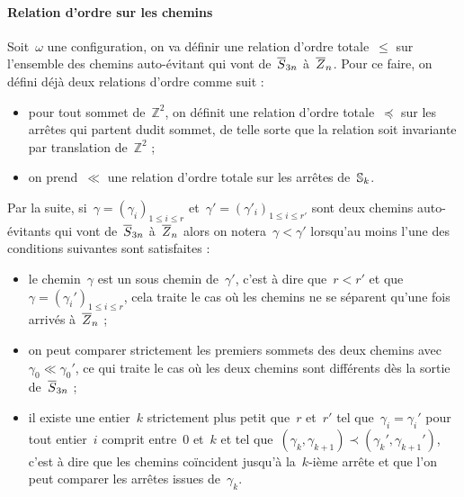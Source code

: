 		\paragraph{Relation d'ordre sur les chemins}
			Soit~$\omega$ une configuration, on va définir une relation d'ordre totale~$\leq$ sur l'ensemble des chemins auto-évitant qui vont de~$\overline{S}_{3n}$ à~$\overline{Z}_{n}$. Pour ce faire, on défini déjà deux relations d'ordre comme suit :
			\begin{itemize}
				\item pour tout sommet de~$\mathbb{Z}^2$, on définit une relation d'ordre totale~$\preceq$ sur les arrêtes qui partent dudit sommet, de telle sorte que la relation soit invariante par translation de~$\mathbb{Z}^2$ ;
				\item on prend~$\ll$ une relation d'ordre totale sur les arrêtes de~$\mathbb{S}_k$.
			\end{itemize}
			Par la suite, si~$\gamma = \left(\gamma_i\right)_{1\leq i\leq r}$ et~$\gamma'=\left(\gamma'_i\right)_{1\leq i\leq r'}$ sont deux chemins auto-évitants qui vont de~$\overline{S}_{3n}$ à~$\overline{Z}_{n}$ alors on notera~$\gamma <\gamma'$ lorsqu'au moins l'une des conditions suivantes sont satisfaites :
			\begin{itemize}
				\item le chemin~$\gamma$ est un sous chemin de~$\gamma'$, c'est à dire que~$r<r'$ et que~$\gamma = \left(\gamma_i'\right)_{1\leq i\leq r}$, cela traite le cas où les chemins ne se séparent qu'une fois arrivés à~$\overline{Z}_{n}$ ;
				\item on peut comparer strictement les premiers sommets des deux chemins avec~$\gamma_0 \ll \gamma_0'$, ce qui traite le cas où les deux chemins sont différents dès la sortie de~$\overline{S}_{3n}$ ;
				\item il existe une entier~$k$ strictement plus petit que~$r$ et~$r'$ tel que~$\gamma_i=\gamma_i'$ pour tout entier~$i$ comprit entre~$0$ et~$k$ et tel que~$(\gamma_k,\gamma_{k+1}) \prec (\gamma_k',\gamma_{k+1}')$, c'est à dire que les chemins coïncident jusqu'à la~$k$-ième arrête et que l'on peut comparer les arrêtes issues de~$\gamma_k$.
		\end{itemize}
